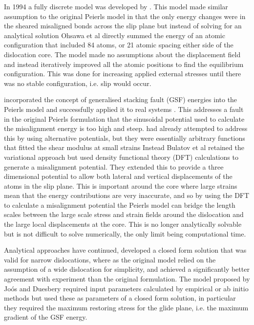 In 1994 a fully discrete model was developed by \citet{Ohsawa1994}. This model made similar assumption to the original Peierls model in that the only energy changes were in the sheared misaligned bonds across the slip plane but instead of solving for an analytical solution Ohsawa et al directly summed the energy of an atomic configuration that included 84 atoms, or 21 atomic spacing either side of the dislocation core. The model made no assumptions about the displacement field and instead iteratively improved all the atomic positions to find the equilibrium configuration. This was done for increasing applied external stresses until there was no stable configuration, i.e. slip would occur.



\citet{Bulatov1997} incorporated the concept of generalised stacking fault (GSF) energies into the Peierls model and successfully applied it to real systems \cite{Lu2000aluminium}. This addresses a fault in the original Peierls formulation that the sinusoidal potential used to calculate the misalignment energy is too high and steep. \citet{Ohsawa1994} had already attempted to address this by using alternative potentials, but they were essentially arbitrary functions that fitted the shear modulus at small strains Instead Bulatov et al retained the variational approach but used density functional theory (DFT) calculations to generate a misalignment potential. They extended this to provide a three dimensional potential to allow both lateral and vertical displacements of the atoms in the slip plane. This is important around the core where large strains mean that the energy contributions are very inaccurate, and so by using the DFT to calculate a misalignment potential the Peierls model can bridge the length scales between the large scale stress and strain fields around the dislocation and the large local displacements at the core. This is no longer analytically solvable but is not difficult to solve numerically, the only limit being computational time.

Analytical approaches have continued, \citet{Joos1997} developed a closed form solution that was valid for narrow dislocations, where as the original model relied on the assumption of a wide dislocation for simplicity, and achieved a significantly better agreement with experiment than the original formulation. The model proposed by Joós and Duesbery required input parameters calculated by empirical or ab initio methods but used these as parameters of a closed form solution, in particular they required the maximum restoring stress for the glide plane, i.e. the maximum gradient of the GSF energy.

